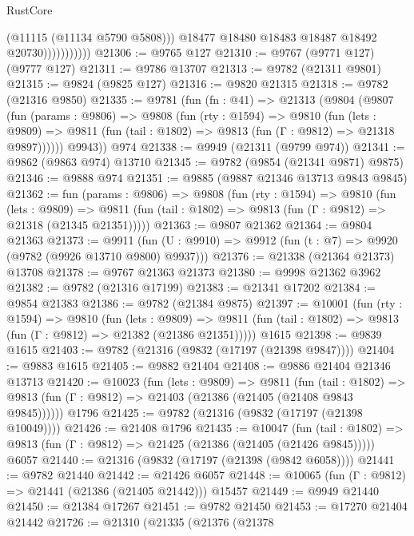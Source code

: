 \begin{lexlean}{RustCore}
\begin{coremodule}
                            (@11115 (@11134 @5790 @5808)))
                          @18477
                          @18480
                          @18483
                          @18487
                          @18492
                          @20730)))))))))))
@21306 := @9765 @127
@21310 := @9767 (@9771 @127) (@9777 @127)
@21311 := @9786 @13707
@21313 := @9782 (@21311 @9801)
@21315 := @9824 (@9825 @127)
@21316 := @9820 @21315
@21318 := @9782 (@21316 @9850)
@21335 := @9781
    (fun (fn : @41) =>
    @21313
      (@9804
        (@9807
          (fun (params : @9806) =>
          @9808
            (fun (rty : @1594) =>
            @9810
              (fun (lets : @9809) =>
              @9811 (fun (tail : @1802) => @9813 (fun (Γ : @9812) => @21318 @9897))))))
        @9943))
    @974
@21338 := @9949 (@21311 (@9799 @974))
@21341 := @9862 (@9863 @974) @13710
@21345 := @9782 (@9854 (@21341 @9871) @9875)
@21346 := @9888 @974
@21351 := @9885 (@9887 @21346 @13713 @9843 @9845)
@21362 := fun (params : @9806) =>
  @9808
    (fun (rty : @1594) =>
    @9810
      (fun (lets : @9809) =>
      @9811 (fun (tail : @1802) => @9813 (fun (Γ : @9812) => @21318 (@21345 @21351)))))
@21363 := @9807 @21362
@21364 := @9804 @21363
@21373 := @9911
    (fun (U : @9910) => @9912 (fun (t : @7) => @9920 (@9782 (@9926 @13710 @9800) @9937)))
@21376 := @21338 (@21364 @21373) @13708
@21378 := @9767 @21363 @21373
@21380 := @9998 @21362 @3962
@21382 := @9782 (@21316 @17199)
@21383 := @21341 @17202
@21384 := @9854 @21383
@21386 := @9782 (@21384 @9875)
@21397 := @10001
    (fun (rty : @1594) =>
    @9810
      (fun (lets : @9809) =>
      @9811 (fun (tail : @1802) => @9813 (fun (Γ : @9812) => @21382 (@21386 @21351)))))
    @1615
@21398 := @9839 @1615
@21403 := @9782 (@21316 (@9832 (@17197 (@21398 @9847))))
@21404 := @9883 @1615
@21405 := @9882 @21404
@21408 := @9886 @21404 @21346 @13713
@21420 := @10023
    (fun (lets : @9809) =>
    @9811
      (fun (tail : @1802) =>
      @9813 (fun (Γ : @9812) => @21403 (@21386 (@21405 (@21408 @9843 @9845))))))
    @1796
@21425 := @9782 (@21316 (@9832 (@17197 (@21398 @10049))))
@21426 := @21408 @1796
@21435 := @10047
    (fun (tail : @1802) => @9813 (fun (Γ : @9812) => @21425 (@21386 (@21405 (@21426 @9845)))))
    @6057
@21440 := @21316 (@9832 (@17197 (@21398 (@9842 @6058))))
@21441 := @9782 @21440
@21442 := @21426 @6057
@21448 := @10065 (fun (Γ : @9812) => @21441 (@21386 (@21405 @21442))) @15457
@21449 := @9949 @21440
@21450 := @21384 @17267
@21451 := @9782 @21450
@21453 := @17270 @21404 @21442
@21726 := @21310
    (@21335
      (@21376
        (@21378

\end{coremodule}
\end{lexlean}
